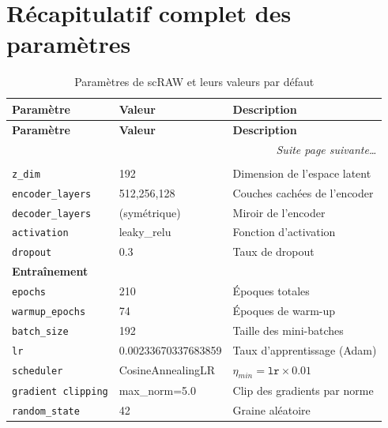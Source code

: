 \documentclass[11pt,a4paper]{article}
\begin{document}
\section{R\'ecapitulatif complet des param\`etres}
\label{sec:all_params}

\begin{longtable}{p{4.8cm}p{2.2cm}p{7cm}}
\caption{Param\`etres de scRAW et leurs valeurs par d\'efaut} \label{tab:all_params} \\
\toprule
\textbf{Param\`etre} & \textbf{Valeur} & \textbf{Description} \\
\midrule
\endfirsthead
\toprule
\textbf{Param\`etre} & \textbf{Valeur} & \textbf{Description} \\
\midrule
\endhead
\midrule
\multicolumn{3}{r}{\textit{Suite page suivante\ldots}} \\
\bottomrule
\endfoot
\bottomrule
\endlastfoot

\multicolumn{3}{l}{\cellcolor{enccolor!8}\textbf{Architecture r\'eseau}} \\
\midrule
\texttt{z\_dim} & 192 & Dimension de l'espace latent \\
\texttt{encoder\_layers} & 512,256,128 & Couches cach\'ees de l'encoder \\
\texttt{decoder\_layers} & (sym\'etrique) & Miroir de l'encoder \\
\texttt{activation} & leaky\_relu & Fonction d'activation \\
\texttt{dropout} & 0.3 & Taux de dropout \\

\midrule
\multicolumn{3}{l}{\cellcolor{phaseblue!8}\textbf{Entra\^inement}} \\
\midrule
\texttt{epochs} & 210 & \'Epoques totales \\
\texttt{warmup\_epochs} & 74 & \'Epoques de warm-up \\
\texttt{batch\_size} & 192 & Taille des mini-batches \\
\texttt{lr} & 0.00233670337683859 & Taux d'apprentissage (Adam) \\
\texttt{scheduler} & CosineAnnealingLR & $\eta_{min} = \texttt{lr} \times 0.01$ \\
\texttt{gradient clipping} & max\_norm=5.0 & Clip des gradients par norme \\
\texttt{random\_state} & 42 & Graine al\'eatoire \\


\end{longtable}
\end{document}

